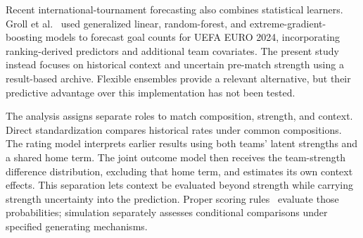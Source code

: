 Recent international-tournament forecasting also combines statistical learners. Groll et al.~\cite{groll2024combined} used generalized linear, random-forest, and extreme-gradient-boosting models to forecast goal counts for UEFA EURO 2024, incorporating ranking-derived predictors and additional team covariates. The present study instead focuses on historical context and uncertain pre-match strength using a result-based archive. Flexible ensembles provide a relevant alternative, but their predictive advantage over this implementation has not been tested.

The analysis assigns separate roles to match composition, strength, and context. Direct standardization compares historical rates under common compositions. The rating model interprets earlier results using both teams' latent strengths and a shared home term. The joint outcome model then receives the team-strength difference distribution, excluding that home term, and estimates its own context effects. This separation lets context be evaluated beyond strength while carrying strength uncertainty into the prediction. Proper scoring rules~\cite{gneiting2007scoring} evaluate those probabilities; simulation separately assesses conditional comparisons under specified generating mechanisms.